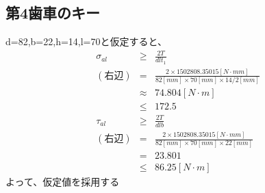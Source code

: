 \subsection{第4歯車のキー}
d=82,b=22,h=14,l=70と仮定すると、
\begin{eqnarray}
\sigma_{al} &\geq& \frac{2T}{dlt_1}\\
(右辺) &=& \frac{2 \times 1502808.35015[N \cdot mm]}{82[mm] \times 70[mm] \times 14/2[mm]}\\
       &\approx&74.804[N \cdot m]\\
       &\leq& 172.5\\
\tau_{al} &\geq& \frac{2T}{dlb}\\
(右辺) &=& \frac{2 \times 1502808.35015[N \cdot mm]}{82[mm] \times 70[mm] \times 22[mm]}\\
       &=& 23.801\\
       &\leq&86.25[N \cdot m]
\end{eqnarray}
よって、仮定値を採用する
